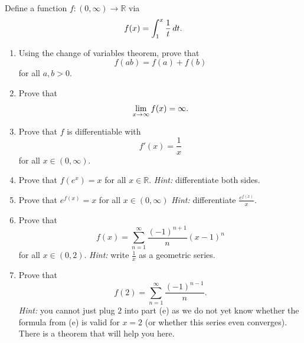 \documentclass[12pt, letterpaper]{article}
\newcommand{\0}{\mathbf{0}}
\newcommand{\1}{\mathbf{1}}
\begin{document}
\begin{enumerate}
    Define a function $f : (0, \infty) \to \mathbb{R}$ via
    \begin{equation*}
        f(x) = \int_{1}^{x} \frac{1}{t}\,dt.\\[5pt]
    \end{equation*}
    \begin{enumerate}
        \item 
        Using the change of variables theorem, prove that
        \begin{equation*}
            f(ab) = f(a) + f(b)
        \end{equation*}
        for all $a, b > 0$.\\

        \item 
        Prove that
        \begin{equation*}
            \lim_{x \to \infty} f(x) = \infty.\\[5pt]
        \end{equation*}

        \item 
        Prove that $f$ is differentiable with
        \begin{equation*}
            f'(x) = \frac{1}{x}
        \end{equation*}
        for all $x \in (0, \infty)$.\\

        \item 
        Prove that $f(e^x) = x$ for all $x \in \mathbb{R}$. \textit{Hint:} differentiate both sides.\\

        \item 
        Prove that $e^{f(x)} = x$ for all $x \in (0, \infty)$ \textit{Hint:} differentiate $\frac{e^{f(x)}}{x}$.\\

        \item 
        Prove that
        \begin{equation*}
            f(x) = \sum_{n = 1}^{\infty} \frac{(-1)^{n + 1}}{n} (x - 1)^n
        \end{equation*}
        for all $x \in (0, 2)$. \textit{Hint:} write $\frac{1}{x}$ as a geometric series.\\

        \item 
        Prove that
        \begin{equation*}
            f(2) = \sum_{n = 1}^{\infty} \frac{(-1)^{n - 1}}{n}.
        \end{equation*}
        \textit{Hint:} you cannot just plug $2$ into part (e) as we do not yet know whether the formula from (e) is valid for $x = 2$ (or whether this series even converges). There is a theorem that will help you here.
        

\end{enumerate}
\end{enumerate}
\end{document}
